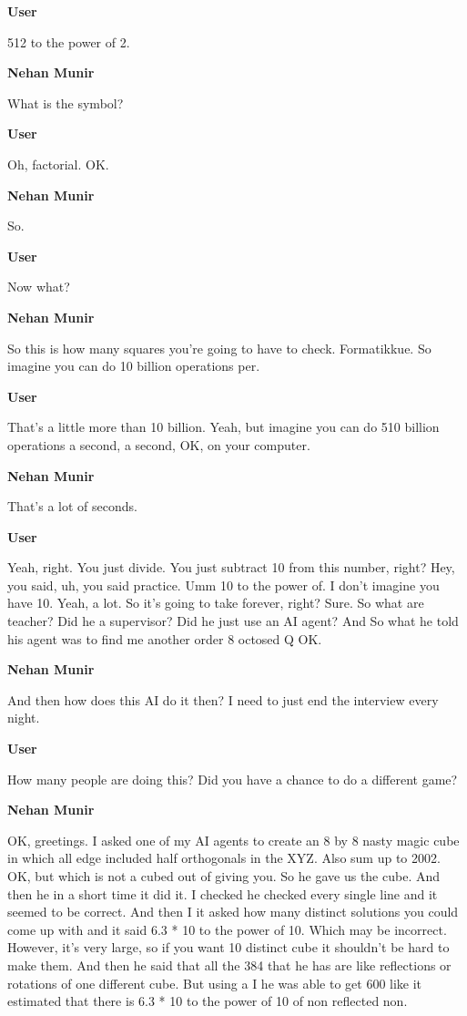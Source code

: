 \documentclass{article}
\begin{document}
\noindent \textbf{User}

512 to the power of 2.

\noindent \textbf{Nehan Munir}

What is the symbol?

\noindent \textbf{User}

Oh, factorial. OK.

\noindent \textbf{Nehan Munir}

So.

\noindent \textbf{User}

Now what?

\noindent \textbf{Nehan Munir}

So this is how many squares you're going to have to check. Formatikkue. So imagine you can do 10 billion operations per.

\noindent \textbf{User}

That's a little more than 10 billion. Yeah, but imagine you can do 510 billion operations a second, a second, OK, on your computer.

\noindent \textbf{Nehan Munir}

That's a lot of seconds.

\noindent \textbf{User}

Yeah, right. You just divide. You just subtract 10 from this number, right? Hey, you said, uh, you said practice. Umm 10 to the power of. I don't imagine you have 10. Yeah, a lot. So it's going to take forever, right? Sure. So what are teacher? Did he a supervisor? Did he just use an AI agent? And So what he told his agent was to find me another order 8 octosed Q OK.

\noindent \textbf{Nehan Munir}

And then how does this AI do it then? I need to just end the interview every night. 

\noindent \textbf{User}

How many people are doing this? Did you have a chance to do a different game?

\noindent \textbf{Nehan Munir}

OK, greetings. I asked one of my AI agents to create an 8 by 8 nasty magic cube in which all edge included half orthogonals in the XYZ. Also sum up to 2002. OK, but which is not a cubed out of giving you. So he gave us the cube. And then he in a short time it did it. I checked he checked every single line and it seemed to be correct. And then I it asked how many distinct solutions you could come up with and it said 6.3 * 10 to the power of 10. Which may be incorrect. However, it's very large, so if you want 10 distinct cube it shouldn't be hard to make them. And then he said that all the 384 that he has are like reflections or rotations of one different cube. But using a I he was able to get 600 like it estimated that there is 6.3 * 10 to the power of 10 of non reflected non.
\end{document}
